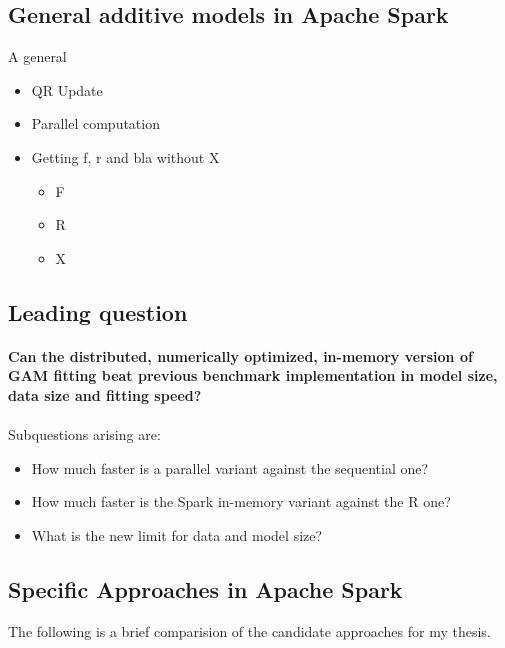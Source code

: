 \documentclass{article}
\begin{document}
    \subsection{General additive models in Apache Spark}
    A general
    \begin{itemize}
        \item QR Update
        \item Parallel computation
        \item Getting f, r and bla without X
        \begin{itemize}
            \item F
            \item R
            \item X
        \end{itemize}
    \end{itemize}


    \subsection{Leading question}

    \paragraph{Can the distributed, numerically optimized, in-memory version of GAM fitting beat previous benchmark implementation in model size, data size and fitting speed?}

    \paragraph{}
    Subquestions arising are:
        \begin{itemize}
        \item How much faster is a parallel variant against the sequential one?
        \item How much faster is the Spark in-memory variant against the R one?
        \item What is the new limit for data and model size?
        \end{itemize}

    \subsection{Specific Approaches in Apache Spark}
    The following is a brief comparision of the candidate approaches for my thesis.
\end{document}
